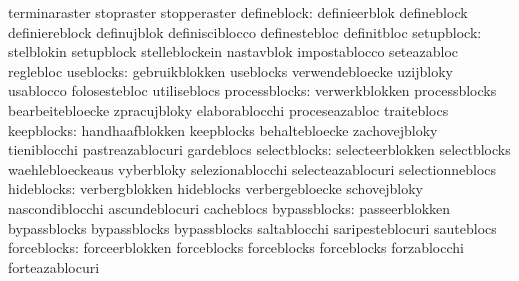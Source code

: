                                   terminaraster                    stopraster
                                  stopperaster
                     defineblock: definieerblok                    defineblock
                                  definiereblock                   definujblok
                                  definisciblocco                  definestebloc
                                  definitbloc
                      setupblock: stelblokin                       setupblock
                                  stelleblockein                   nastavblok
                                  impostablocco                    seteazabloc
                                  reglebloc
                       useblocks: gebruikblokken                   useblocks
                                  verwendebloecke                  uzijbloky
                                  usablocco                        folosestebloc
                                  utiliseblocs
                   processblocks: verwerkblokken                   processblocks
                                  bearbeitebloecke                 zpracujbloky
                                  elaborablocchi                   proceseazabloc
                                  traiteblocs
                      keepblocks: handhaafblokken                  keepblocks
                                  behaltebloecke                   zachovejbloky
                                  tieniblocchi                     pastreazablocuri
                                  gardeblocs
                    selectblocks: selecteerblokken                 selectblocks
                                  waehlebloeckeaus                 vyberbloky
                                  selezionablocchi                 selecteazablocuri
                                  selectionneblocs
                      hideblocks: verbergblokken                   hideblocks
                                  verbergebloecke                  schovejbloky
                                  nascondiblocchi                  ascundeblocuri
                                  cacheblocs
                    bypassblocks: passeerblokken                   bypassblocks
                                  bypassblocks                     bypassblocks
                                  saltablocchi                     saripesteblocuri
                                  sauteblocs
                     forceblocks: forceerblokken                   forceblocks
                                  forceblocks                      forceblocks
                                  forzablocchi                     forteazablocuri
